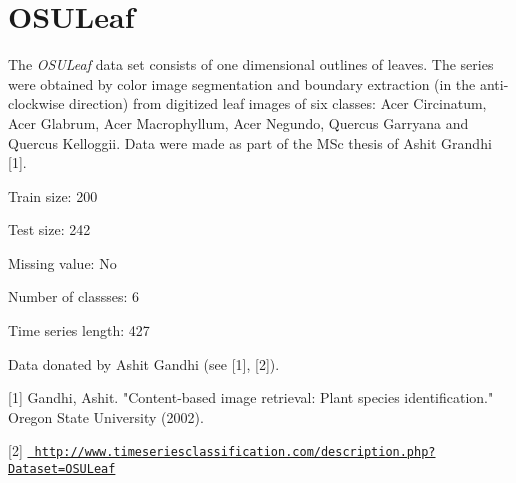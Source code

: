 \chapter{OSULeaf}
\hypertarget{md_external_2data_2UCRArchive__2018_2OSULeaf_2README}{}\label{md_external_2data_2UCRArchive__2018_2OSULeaf_2README}
\label{md_external_2data_2UCRArchive__2018_2OSULeaf_2README_autotoc_md159}%
%
 The {\itshape OSULeaf} data set consists of one dimensional outlines of leaves. The series were obtained by color image segmentation and boundary extraction (in the anti-\/clockwise direction) from digitized leaf images of six classes\+: Acer Circinatum, Acer Glabrum, Acer Macrophyllum, Acer Negundo, Quercus Garryana and Quercus Kelloggii. Data were made as part of the MSc thesis of Ashit Grandhi \mbox{[}1\mbox{]}.

Train size\+: 200

Test size\+: 242

Missing value\+: No

Number of classses\+: 6

Time series length\+: 427

Data donated by Ashit Gandhi (see \mbox{[}1\mbox{]}, \mbox{[}2\mbox{]}).

\mbox{[}1\mbox{]} Gandhi, Ashit. "{}\+Content-\/based image retrieval\+: Plant species identification."{} Oregon State University (2002).

\mbox{[}2\mbox{]} \href{http://www.timeseriesclassification.com/description.php?Dataset=OSULeaf}{\texttt{ http\+://www.\+timeseriesclassification.\+com/description.\+php?\+Dataset=\+OSULeaf}} 